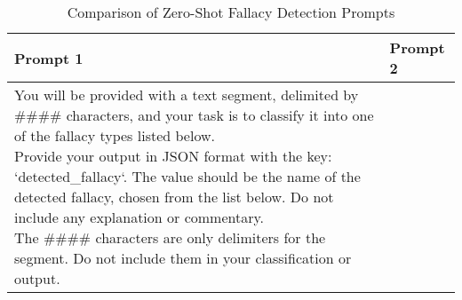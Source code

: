 \begin{table}[H]
    \centering
    \renewcommand{\arraystretch}{1.1}
    \captionsetup{justification=centering}
    \caption{Comparison of Zero-Shot Fallacy Detection Prompts}
    \scriptsize %
    \begin{tabular}{|m{}|m{}|}
        \hline
        \textbf{Prompt 1} & \textbf{Prompt 2} \\
        \hline
        \parbox[t]{0.45\textwidth}{%
            You will be provided with a text segment, delimited by \#\#\#\# characters, and your task is to classify it into one of the fallacy types listed below. \\
            
            Provide your output in JSON format with the key: `detected\_fallacy`. The value should be the name of the detected fallacy, chosen from the list below. Do not include any explanation or commentary. \\

            The \#\#\#\# characters are only delimiters for the segment. Do not include them in your classification or output. \\

}
\end{tabular}
\end{table}
